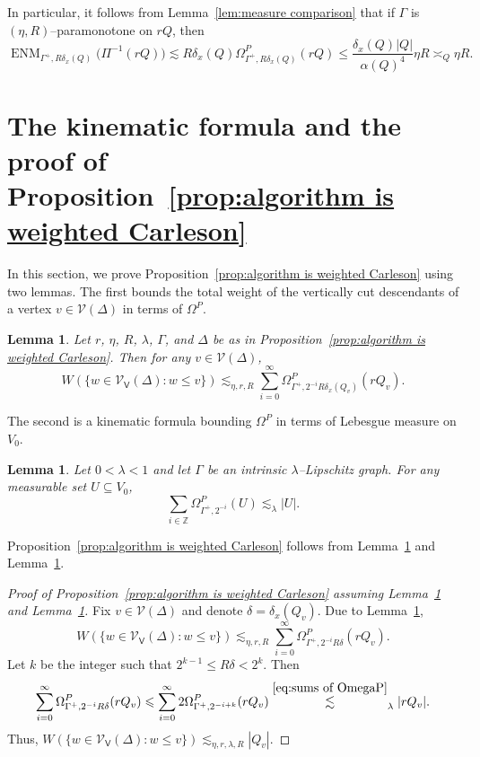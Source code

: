 \documentclass[11pt,reqno]{amsart}
\newcommand{\Z}{\mathbb{Z}}
\newcommand{\cV}{\mathcal{V}}
\renewcommand{\approx}{\asymp}
\newcommand{\0}{\mathbf{0}}
\renewcommand{\1}{\mathbf 1}
\renewcommand{\mid}{:}
\renewcommand{\subset}{\subseteq}
\renewcommand{\le}{\leqslant}
\newtheorem{lemma}[thm]{Lemma}
\theoremstyle{remark}
\DeclareMathOperator{\ENM}{ENM}
\newcommand{\cVv}{{\mathcal{V}_{\mathsf{V}}}}
\begin{document}
In particular, it follows from Lemma~\ref{lem:measure comparison} that if $\Gamma$ is $(\eta,R)$--paramonotone on $rQ$, then
\begin{equation}\label{eq:ENM of paramonotone}
  \ENM_{\Gamma^+,R \delta_x(Q)}\big(\Pi^{-1}(rQ)\big)\lesssim R \delta_x(Q) \Omega^P_{\Gamma^+,R\delta_x(Q)}(r Q) \le \frac{\delta_x(Q) |Q|} {\alpha(Q)^{4}} \eta R \approx_Q \eta R.
\end{equation}
\section{The kinematic formula and the proof of Proposition~\ref{prop:algorithm is weighted Carleson}}\label{sec:weighted Carleson}
In this section, we prove Proposition~\ref{prop:algorithm is weighted Carleson} using two lemmas.  The first bounds the total weight of the vertically cut descendants of a vertex $v\in \cV(\Delta)$ in terms of $\Omega^P$.
\begin{lemma}\label{lem:weight bounded by Omega}
  Let $r$, $\eta$, $R$, $\lambda$, $\Gamma$, and $\Delta$ be as in Proposition~\ref{prop:algorithm is weighted Carleson}.  Then for any $v\in \cV(\Delta)$,
  \begin{equation}\label{eq:weight bounded by Omega}
    W(\{w\in \cVv(\Delta)\mid w\le v\}) \lesssim_{\eta, r,R} \sum_{i=0}^\infty \Omega^P_{\Gamma^+,2^{-i} R\delta_x(Q_v)}(rQ_v).
  \end{equation}
\end{lemma}
The second is a kinematic formula bounding $\Omega^P$ in terms of Lebesgue measure on $V_0$.
\begin{lemma}\label{lem:sums of OmegaP}
  Let $0<\lambda<1$ and let $\Gamma$ be an intrinsic $\lambda$--Lipschitz graph.  For any measurable set $U\subset V_0$,
  \begin{equation}\label{eq:sums of OmegaP}
    \sum_{i\in \Z} \Omega^P_{\Gamma^+,2^{-i}}(U)\lesssim_{\lambda} |U|.
  \end{equation}
\end{lemma}

Proposition~\ref{prop:algorithm is weighted Carleson} follows from Lemma~\ref{lem:weight bounded by Omega} and Lemma~\ref{lem:sums of OmegaP}.
\begin{proof}[{Proof of Proposition~\ref{prop:algorithm is weighted Carleson} assuming Lemma~\ref{lem:weight bounded by Omega} and Lemma~\ref{lem:sums of OmegaP}}]
  Fix $v\in \cV(\Delta)$ and denote $\delta=\delta_x(Q_v)$.  Due to Lemma~\ref{lem:weight bounded by Omega},
  $$W(\{w\in \cVv(\Delta)\mid w\le v\}) \lesssim_{\eta, r,R} \sum_{i=0}^\infty \Omega^P_{\Gamma^+,2^{-i} R\delta}(rQ_v).$$
  Let $k$ be the integer such that $2^{k-1}\le R\delta <2^{k}$.  Then
  \begin{align*}
    \sum_{i=0}^\infty \Omega^P_{\Gamma^+,2^{-i} R\delta}(rQ_v)
     \le \sum_{i=0}^\infty 2 \Omega^P_{\Gamma^+,2^{-i+k}}(rQ_v)
     \stackrel{\eqref{eq:sums of OmegaP}}{\lesssim}_{\lambda} |rQ_v|.
  \end{align*}
  Thus, $W(\{w\in \cVv(\Delta)\mid w\le v\}) \lesssim_{\eta, r,\lambda, R} |Q_v|.$
\end{proof}
\end{document}

